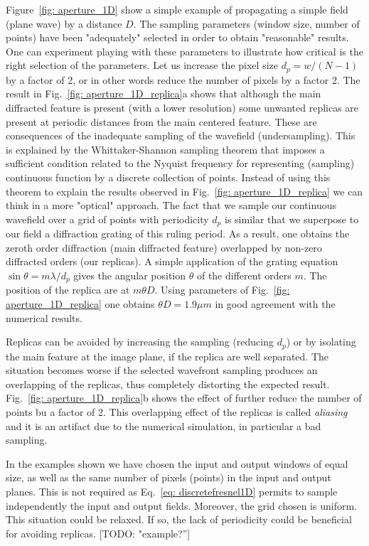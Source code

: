 \documentclass{iucr}              %
\newcommand{\todo}[1]{{\color{red}[TODO: "#1'']}}
\begin{document}
Figure~\ref{fig: aperture_1D} show a simple example of propagating a simple field (plane wave) by a distance $D$. The sampling parameters (window size, number of points) have been "adequately" selected in order to obtain "reasonable" results. One can experiment playing with these parameters to illustrate how critical is the right selection of the parameters. Let us increase the pixel size $d_p=w/(N-1)$ by a factor of 2, or in other words reduce the number of pixels by a factor 2. The result in Fig.~\ref{fig: aperture_1D_replica}a shows that although the main diffracted feature is present (with a lower resolution) some unwanted replicas are present at periodic distances from the main centered feature. These are consequences of the inadequate sampling of the wavefield (undersampling). This is explained by the Whittaker-Shannon sampling theorem that imposes a sufficient condition related to the Nyquist frequency for representing (sampling) continuous function by a discrete collection of points. Instead of using this theorem to explain the results observed in Fig.~\ref{fig: aperture_1D_replica} we can think in a more "optical" approach. The fact that we sample our continuous wavefield over a grid of points with periodicity $d_p$ is similar that we superpose to our field a diffraction grating of this ruling period. As a result, one obtains the zeroth order diffraction (main diffracted feature) overlapped by non-zero diffracted orders (our replicas). A simple application of the grating equation $\sin \theta = m \lambda / d_p $ gives the angular position $\theta$ of the different orders $m$. The position of the replica are at $m \theta D$. Using parameters of Fig.~\ref{fig: aperture_1D_replica} one obtains $\theta D= 1.9 \mu m$ in good agreement with the numerical results. 

Replicas can be avoided by increasing the sampling (reducing $d_p$) or by isolating the main feature at the image plane, if the replica are well separated. The situation becomes worse if the selected wavefront sampling produces an overlapping of the replicas, thus completely distorting the expected result. Fig.~\ref{fig: aperture_1D_replica}b shows the effect of further reduce the number of points bu a factor of 2. This overlapping effect of the replicas is called {\it aliasing} and it is an artifact due to the numerical simulation, in particular a bad sampling. 

In the examples shown we have chosen the input and output windows of equal size, as well as the same number of pixels (points) in the input and output planes. This is not required as Eq.~\ref{eq: discretefresnel1D} permits to sample independently the input and output fields. Moreover, the grid chosen is uniform. This situation could be relaxed. If so, the lack of periodicity could be beneficial for avoiding replicas. \todo{example?}
\end{document}
